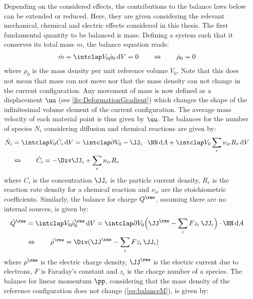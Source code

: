 Depending on the considered effects, the contributions to the balance laws below can be extended or reduced. Here, they are given considering the relevant mechanical, chemical and electric effects considered in this thesis. The first fundamental quantity to be balanced is mass. Defining a system such that it conserves its total mass $m$, the balance equation reads:
\begin{align}
  \dot m = \intVO \dot\rho_0 \dV = 0 \qquad \Leftrightarrow \qquad \dot\rho_0 = 0
  \label{eq:balanceM}
\end{align}
where $\rho_0$ is the mass density per unit reference volume $V_0$. Note that this does not mean that mass can not move nor that the mass density can not change in the current configuration. Any movement of mass is now defined as a displacement $\uu$ (see \cref{fig:DeformationGradient}) which changes the shape of the infinitesimal volume element of the current configuration. The average mass velocity of each material point is thus given by $\dot \uu$. The balances for the number of species $N_i$ considering diffusion and chemical reactions are given by:
\begin{align}
  \begin{aligned}
  \dot N_i  &= \intVO \dot C_i \dV  = \intdVO -\JJ_i \cdot \NN\dA  +  \intVO \sum_r \nu_{ir } R_r \dV \\
            &\Leftrightarrow \qquad \dot C_i = -\Div\JJ_i + \sum_r \nu_{ir } R_r 
  \end{aligned}
  \label{eq:balanceC}
\end{align}  
where $C_i$ is the concentration $\JJ_i$ is the particle current density, $R_r$ is the reaction rate density for a chemical reaction and $\nu_{ir}$ are the stoichiometric coefficients. Similarly, the balance for charge $Q^\rme$, assuming there are no internal sources, is given by:
\begin{align}
  \begin{aligned}
  \dot Q^\rme &= \intVO \dot \rho^\rme_0 \dV = \intdVO \Big(\JJ^\rme-\sum_i Fz_i\,\JJ_i\Big) \cdot \NN\dA \\
            &\Leftrightarrow \qquad \dot \rho^{\rme} = \Div(\JJ^\rme - \sum_i Fz_i\, \JJ_i)
  \end{aligned}
\end{align}
where $\rho^\rme$ is the electric charge density, $\JJ^\rme$ is the electric current due to electrons, $F$ is Faraday's constant and $z_i$ is the charge number of a species. The balance for linear momentum $\pp$, considering that the mass density of the reference configuration does not change (\cref{eq:balanceM}), is given by:
